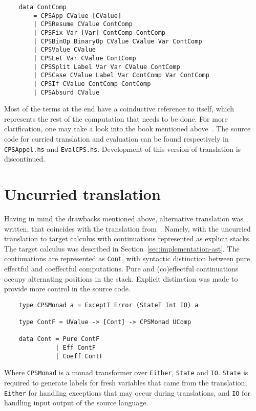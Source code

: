 \documentclass[declaration,shortabstract]{iithesis}
\theoremstyle{definition} \newtheorem{definition}{Definition}[chapter]
\theoremstyle{remark} \newtheorem{remark}[definition]{Observation}
\theoremstyle{plain} \newtheorem{theorem}[definition]{Theorem}
\theoremstyle{plain} \newtheorem{lemma}[definition]{Lemma}
\begin{document}
\begin{verbatim}
    data ContComp
        = CPSApp CValue [CValue]
        | CPSResume CValue ContComp
        | CPSFix Var [Var] ContComp ContComp
        | CPSBinOp BinaryOp CValue CValue Var ContComp
        | CPSValue CValue
        | CPSLet Var CValue ContComp
        | CPSSplit Label Var Var CValue ContComp
        | CPSCase CValue Label Var ContComp Var ContComp
        | CPSIf CValue ContComp ContComp
        | CPSAbsurd CValue
\end{verbatim}
    Most of the terms at the end have a coinductive reference to itself, which
    represents the rest of the computation that needs to be done. For more
    clarification, one may take a look into the book mentioned
    above~\cite{appel-continuations}. The source code for curried translation and
    evaluation can be found respectively in \verb!CPSAppel.hs! and
    \verb!EvalCPS.hs!. Development of this version of translation is discontinued.

    \section{Uncurried translation}

    Having in mind the drawbacks mentioned above, alternative translation was
    written, that coincides with the translation from~\cite{handlers-cps-journal}.
    Namely, with the uncurried translation to target calculus with continuations
    represented as explicit stacks. The target calculus was described in
    Section~\ref{sec:implementation-ast}. The continuations are represented as
    \verb!Cont!, with syntactic distinction between pure, effectful and
    coeffectful computations. Pure and (co)effectful continuations occupy
    alternating positions in the stack. Explicit distinction was made to provide
    more control in the source code.

\begin{verbatim}
    type CPSMonad a = ExceptT Error (StateT Int IO) a

    type ContF = UValue -> [Cont] -> CPSMonad UComp

    data Cont = Pure ContF
              | Eff ContF
              | Coeff ContF
\end{verbatim}

    \noindent
    Where \verb!CPSMonad! is a monad transformer over \verb!Either!, \verb!State!
    and \verb!IO!. \verb!State! is required to generate labels for fresh variables
    that came from the translation, \verb!Either! for handling exceptions that
    may occur during translations, and \verb!IO! for handling input output of the
    source language.
\end{document}
